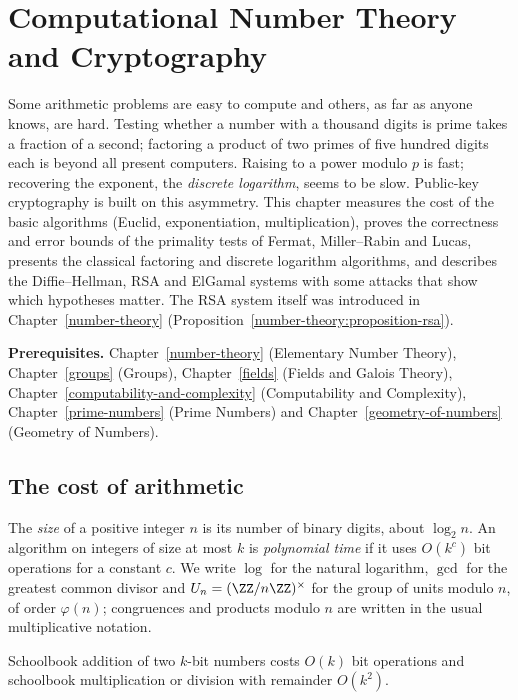 \chapter{Computational Number Theory and Cryptography}\label{cryptography}

Some arithmetic problems are easy to compute and others, as far as anyone knows, are hard. Testing whether a number with a thousand digits is prime takes a fraction of a second; factoring a product of
two primes of five hundred digits each is beyond all present computers. Raising to a power modulo $p$ is fast; recovering the exponent, the \emph{discrete logarithm}, seems to be slow. Public-key
cryptography is built on this asymmetry. This chapter measures the cost of the basic algorithms (Euclid, exponentiation, multiplication), proves the correctness and error bounds of the primality tests
of Fermat, Miller--Rabin and Lucas, presents the classical factoring and discrete logarithm algorithms, and describes the Diffie--Hellman, RSA and ElGamal systems with some attacks that show which
hypotheses matter. The RSA system itself was introduced in Chapter~\ref{number-theory} (Proposition~\ref{number-theory:proposition-rsa}).

\noindent\textbf{Prerequisites.} Chapter~\ref{number-theory} (Elementary Number Theory), Chapter~\ref{groups} (Groups), Chapter~\ref{fields} (Fields and Galois Theory),
Chapter~\ref{computability-and-complexity} (Computability and Complexity), Chapter~\ref{prime-numbers} (Prime Numbers) and Chapter~\ref{geometry-of-numbers} (Geometry of Numbers).

\section{The cost of arithmetic}\label{cryptography:section-algorithms}

\begin{notation}\label{cryptography:notation-cost}
The \emph{size} of a positive integer $n$ is its number of binary digits, about $\log_2n$. An algorithm on integers of size at most $k$ is \emph{polynomial time} if it uses $O(k^c)$ bit operations for a constant
$c$. We write $\log$ for the natural logarithm, $\gcd$ for the greatest common divisor and $U_n = (\ZZ/n\ZZ)^\times$ for the group of units modulo $n$, of order $\varphi(n)$; congruences and products modulo $n$ are
written in the usual multiplicative notation.
\end{notation}

Schoolbook addition of two $k$-bit numbers costs $O(k)$ bit operations and schoolbook multiplication or division with remainder $O(k^2)$.

